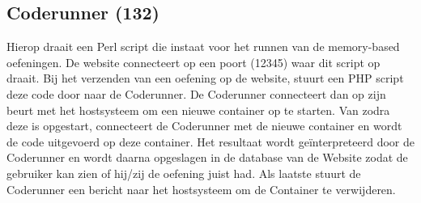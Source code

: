 \subsection{Coderunner (132)}
Hierop draait een Perl script die instaat voor het runnen van de memory-based oefeningen. De website connecteert op een poort (12345) waar dit script op draait. Bij het verzenden van een oefening op de website, stuurt een PHP script deze code door naar de Coderunner. De Coderunner connecteert dan op zijn beurt met het hostsysteem om een nieuwe container op te starten. Van zodra deze is opgestart, connecteert de Coderunner met de nieuwe container en wordt de code uitgevoerd op deze container. Het resultaat wordt ge\"interpreteerd door de Coderunner en wordt daarna opgeslagen in de database van de Website zodat de gebruiker kan zien of hij/zij de oefening juist had. Als laatste stuurt de Coderunner een bericht naar het hostsysteem om de Container te verwijderen.
